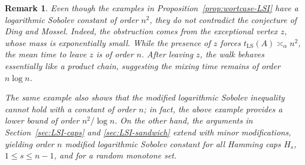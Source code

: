 \documentclass[12pt,final]{amsart}
\newcommand{\1}{\mathbf{1}}
\newtheorem{theorem}{Theorem}[section]
\newtheorem{remark}[theorem]{Remark}
\newcommand{\Ent}{\operatorname{Ent}}
\newcommand{\Ecal}{\mathcal{E}}
\begin{document}


\begin{remark}
    Even though the examples in Proposition~\ref{prop:wortcase-LSI} have a logarithmic Sobolev constant of order $n^2$, they do not contradict the conjecture of Ding and Mossel. Indeed, the obstruction comes from the exceptional vertex $z$, whose mass is exponentially small. While the presence of $z$ forces $t_{\operatorname{LS}}(A)  \asymp_\alpha n^2$, the mean time to leave $z$ is of order $n$. After leaving $z$, the walk behaves essentially like a product chain, suggesting the mixing time remains of order $n\log n$. 

    The same example also shows that the modified logarithmic Sobolev inequality \cite{bobkov2006modified} cannot hold with a constant of order $n$; in fact, the above example provides a lower bound of order $n^2/\log n$. On the other hand, the arguments in Section~\ref{sec:LSI-caps} and \ref{sec:LSI-sandwich} extend with minor modifications, yielding order $n$ modified logarithmic Sobolev constant for all Hamming caps $H_s$, $1\leq s\leq n-1$, and for a random monotone set. 
\end{remark}
\end{document}
